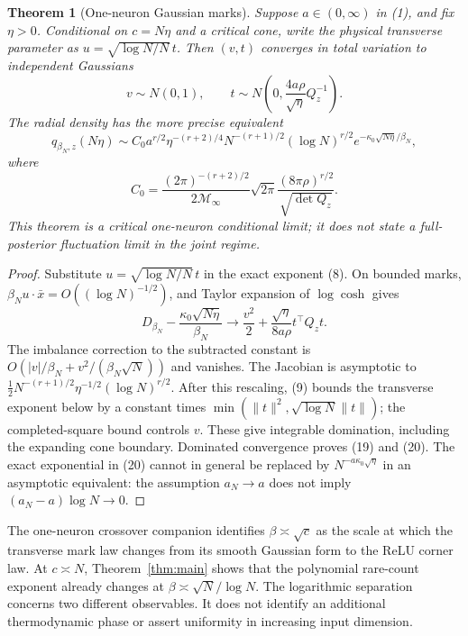 \documentclass[11pt]{article}
\newtheorem{theorem}{Theorem}\newtheorem{lemma}[theorem]{Lemma}
\begin{document}
\begin{theorem}[One-neuron Gaussian marks]\label{thm:marks}
Suppose $a\in(0,\infty)$ in (1), and fix $\eta>0$. Conditional on
$c=N\eta$ and a critical cone, write the physical transverse parameter
as $u=\sqrt{\log N/N}\,t$. Then $(v,t)$ converges in total variation to
independent Gaussians
\[
            v\sim N(0,1),\qquad
            t\sim N\left(0,\frac{4a\rho}{\sqrt\eta}Q_z^{-1}\right).
                                                               \tag{19}
\]
The radial density has the more precise equivalent
\[
 q_{\beta_N,z}(N\eta)\sim
 C_0 a^{r/2}\eta^{-(r+2)/4}N^{-(r+1)/2}(\log N)^{r/2}
                 e^{-\kappa_0\sqrt{N\eta}/\beta_N},      \tag{20}
\]
where
\[
 C_0=\frac{(2\pi)^{-(r+2)/2}}{2\mathcal M_\infty}
                  \sqrt{2\pi}\frac{(8\pi\rho)^{r/2}}{\sqrt{\det Q_z}}.
\]
This theorem is a critical one-neuron conditional limit; it does not
state a full-posterior fluctuation limit in the joint regime.
\end{theorem}
\begin{proof}
Substitute $u=\sqrt{\log N/N}\,t$ in the exact exponent (8).
On bounded marks, $\beta_N u\cdot\bar x=O((\log N)^{-1/2})$, and
Taylor expansion of $\log\cosh$ gives
\[
 D_{\beta_N}-\frac{\kappa_0\sqrt{N\eta}}{\beta_N}
        \longrightarrow \frac{v^2}{2}
                      +\frac{\sqrt\eta}{8a\rho}t^\top Q_z t.
\]
The imbalance correction to the subtracted constant is
$O(|v|/\beta_N+v^2/(\beta_N\sqrt N))$ and vanishes.
The Jacobian is asymptotic to
$\tfrac12 N^{-(r+1)/2}\eta^{-1/2}(\log N)^{r/2}$.
After this rescaling, (9) bounds the transverse exponent below by a
constant times $\min(\|t\|^2,\sqrt{\log N}\|t\|)$; the completed-square
bound controls $v$. These give integrable domination, including the
expanding cone boundary. Dominated convergence proves (19) and (20).
The exact exponential in (20) cannot in general be replaced by
$N^{-a\kappa_0\sqrt\eta}$ in an asymptotic equivalent: the assumption
$a_N\to a$ does not imply $(a_N-a)\log N\to0$.
\end{proof}

The one-neuron crossover companion identifies $\beta\asymp\sqrt c$
as the scale at which the transverse mark law changes from its smooth
Gaussian form to the ReLU corner law. At $c\asymp N$, Theorem~\ref{thm:main}
shows that the polynomial rare-count exponent already changes at
$\beta\asymp\sqrt N/\log N$. The logarithmic separation concerns two
different observables. It does not identify an additional thermodynamic
phase or assert uniformity in increasing input dimension.
\end{document}
